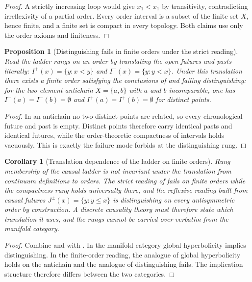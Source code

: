 \documentclass[11pt,letterpaper]{article}
\newtheorem{proposition}[theorem]{Proposition}
\newtheorem{corollary}[theorem]{Corollary}
\theoremstyle{definition}
\theoremstyle{remark}
\begin{document}
\begin{proof}
A strictly increasing loop would give $x_1 < x_1$ by transitivity, contradicting irreflexivity of a partial order. Every order interval is a subset of the finite set $X$, hence finite, and a finite set is compact in every topology. Both claims use only the order axioms and finiteness.
\end{proof}

\begin{proposition}[Distinguishing fails in finite orders under the strict reading]\label{prop:distinguish}
Read the ladder rungs on an order by translating the open futures and pasts literally: $I^+(x) = \{ y : x < y \}$ and $I^-(x) = \{ y : y < x \}$. Under this translation there exists a finite order satisfying the conclusions of  and failing distinguishing: for the two-element antichain $X = \{a, b\}$ with $a$ and $b$ incomparable, one has $I^-(a) = I^-(b) = \emptyset$ and $I^+(a) = I^+(b) = \emptyset$ for distinct points.
\end{proposition}

\begin{proof}
In an antichain no two distinct points are related, so every chronological future and past is empty. Distinct points therefore carry identical pasts and identical futures, while the order-theoretic compactness of intervals holds vacuously. This is exactly the failure mode  forbids at the distinguishing rung.
\end{proof}

\begin{corollary}[Translation dependence of the ladder on finite orders]\label{cor:notransfer}
Rung membership of the causal ladder is not invariant under the translation from continuum definitions to orders. The strict reading of  fails on finite orders while the compactness rung holds universally there, and the reflexive reading built from causal futures $J^{\pm}(x) = \{ y : y \le x \}$ is distinguishing on every antisymmetric order by construction. A discrete causality theory must therefore state which translation it uses, and the rungs cannot be carried over verbatim from the manifold category.
\end{corollary}

\begin{proof}
Combine  and  with . In the manifold category global hyperbolicity implies distinguishing. In the finite-order reading, the analogue of global hyperbolicity holds on the antichain and the analogue of distinguishing fails. The implication structure therefore differs between the two categories.
\end{proof}
\end{document}
